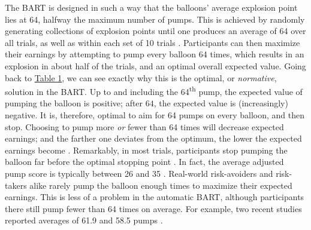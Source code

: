 \documentclass[serif, twocolumn, authordate, meta]{jote-article}
\begin{document}
The BART is designed in such a way that the balloons' average explosion point lies at 64, halfway the maximum number of pumps. This is achieved by randomly generating collections of explosion points until one produces an average of 64 over all trials, as well as within each set of 10 trials \parencite{Lejuez2002}. Participants can then maximize their earnings by attempting to pump every balloon 64 times, which results in an explosion in about half of the trials, and an optimal overall expected value. Going back to \hyperlink{Table 1}{Table 1}, we can see exactly why this is the optimal, or \emph{normative}, solution in the BART. Up to and including the 64\textsuperscript{th} pump, the expected value of pumping the balloon is positive; after $64$, the expected value is (increasingly) negative. It is, therefore, optimal to aim for 64 pumps on every balloon, and then stop. Choosing to pump more \emph{or} fewer than 64 times will decrease expected earnings; and the farther one deviates from the optimum, the lower the expected earnings become \parencite{Lejuez2002, Pleskac2008, Wallsten2005}. Remarkably, in most trials, participants stop pumping the balloon far before the optimal stopping point \parencite{Lejuez2002}. In fact, the average adjusted pump score is typically between 26 and 35 \parencite{Pleskac2008}. Real-world risk-avoiders and risk-takers alike rarely pump the balloon enough times to maximize their expected earnings. This is less of a problem in the automatic BART, although participants there still pump fewer than 64 times on average. For example, two recent studies reported averages of 61.9 \parencite{Bernoster2019} and 58.5 pumps \parencite{deGroot2019}.
\end{document}
